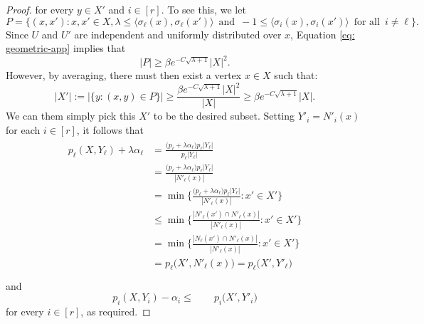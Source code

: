 \begin{proof}
  for every $y \in X'$ and $i \in [r]$. To see this, we let 
  $$ P= \Biggl\{(x,x'): x,x' \in X , \lambda  \le \big\langle \sigma_\ell(x),\sigma_\ell(x') \big\rangle \, \text{ and } \, -1 \le \big\langle \sigma_i(x), \sigma_i(x') \big\rangle \, \text{ for all } \, i \ne \ell  \Biggr\}.$$
  Since $U$ and $U'$ are independent and uniformly distributed over $x$, Equation \ref{eq: geometric-app} implies that
  \begin{equation}
    |P|\geq \beta e^{-C\sqrt{\lambda + 1}}|X|^2.
  \end{equation} 
  However, by averaging, there must then exist a vertex $x \in X$ such that:
  \begin{equation}
    |X'|:=\bigl|\{y: (x,y) \in P  \} \bigr| \ge \frac{\beta e^{-C\sqrt{\lambda+1}}|X|^2}{|X|}\geq  \beta e^{-C\sqrt{\lambda+1}}|X|.
  \end{equation}
  We can them simply pick this $X'$ to be the desired subset.
  Setting $Y'_i = N'_i(x)$ for each $i \in [r]$, it follows that
  \begin{multline}
      \begin{aligned}
      p_\ell(X,Y_\ell) + \lambda \alpha_\ell &= \frac{ \big( p_\ell + \lambda\alpha_\ell \big) p_\ell |Y_\ell |}{p_\ell |Y_\ell|}\\
      &= \frac{ \big( p_\ell + \lambda\alpha_\ell \big) p_\ell |Y_\ell |}{| N'_\ell (x)|}\\
      &= \min\bigg\{ \frac{ \big( p_\ell + \lambda\alpha_\ell \big) p_\ell |Y_\ell |}{| N'_\ell (x)|} : x' \in X' \bigg\}\\
      &\le \min\bigg\{ \frac{|N'_\ell(x') \cap  N'_\ell (x)|}{| N'_\ell (x)|} : x' \in X' \bigg\}\\
      &= \min\bigg\{ \frac{|N_\ell(x') \cap  N'_\ell (x)|}{| N'_\ell (x)|} : x' \in X' \bigg\}\\
      &= p_\ell\big( X', N'_\ell (x) \big) = p_\ell\big( X', Y'_\ell \big) \\
    \end{aligned}
  \end{multline}
  and $$  p_i(X,Y_i) - \alpha_i \le \qquad p_i\big( X', Y'_i \big) $$
  for every $i \in [r]$, as required.
\end{proof}